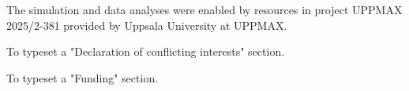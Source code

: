 \documentclass[Afour,sageh,times]{sagej}
\begin{document}
\begin{acks}
The simulation and data analyses were enabled by resources in project UPPMAX 2025/2-381 provided by Uppsala University at UPPMAX.
\end{acks}
\begin{dci}
To typeset a "Declaration of conflicting interests" section.
\end{dci}
\begin{funding}
To typeset a "Funding" section.
\end{funding}




\end{document}
